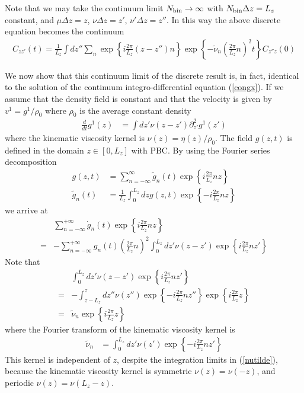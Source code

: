 \documentclass[b5paper,openright,11pt]{book}
\begin{document}
\begin{appendices}
Note that we may take the continuum limit ${N_{\rm bin}}\to\infty$ with ${N_{\rm bin}}\Delta z=L_z$ constant, and $\mu\Delta z=z$, $\nu \Delta z =z'$, $ \nu' \Delta z =z''$. In this way
the above discrete equation becomes the continuum
\begin{align}
  C_{zz'}(t)=\frac{1}{L_z}\int dz''\sum_{n}\exp\left\{i\frac{2\pi}{L_z}(z-z'')n\right\}
\exp\left\{-\tilde{\nu}_n\left(\frac{2\pi}{L_z}n\right)^2t\right\}C_{z''z}(0)
\end{align}

We now  show that this continuum  limit of the discrete  result is, in
fact, identical to the  solution of the continuum integro-differential
equation  (\ref{congx}).   If we  assume  that  the density  field  is
constant  and that  the velocity  is given  by $v^1=g^1/\rho_0$  where
$\rho_0$ is the average constant density
\begin{align}
  \frac{d}{dt} g^1(z)&=\int dz'{\nu}(z-z')\partial^2_{z'} g^1(z')
\label{pgz}
\end{align}
where the kinematic viscosity  kernel is $\nu(z)=\eta(z)/\rho_0$.  The
field $g(z,t)$  is defined  in the domain  $z\in[0,L_z]$ with  PBC. By
using the Fourier series decomposition
\begin{align}
  g(z,t)&=\sum_{n=-\infty}^{\infty} \tilde{g}_n(t) \exp\left\{i\frac{2\pi}{L_z}nz\right\}
\nonumber\\
\tilde{g}_n(t)&=\frac{1}{L_z}\int_0^{L_z}dzg(z,t)  \exp\left\{-i\frac{2\pi}{L_z}nz\right\}
\end{align}
 we arrive at
\begin{align}
&  \sum_{n=-\infty}^{+\infty}\dot{g}_n(t)\exp\left\{i\frac{2\pi}{L_z}nz\right\}
\nonumber\\=&-  \sum_{n=-\infty}^{+\infty}{g}_n(t)\left(\frac{2\pi}{L_z}n\right)^2
\int_0^{L_z}dz'\nu(z-z')\exp\left\{i\frac{2\pi}{L_z}nz'\right\}
\label{Fou1}
\end{align}
Note that
\begin{align}
&  \int_0^{L_z}dz'\nu(z-z')\exp\left\{i\frac{2\pi}{L_z}nz'\right\}
\nonumber\\
=&
-\int_{z-L_z}^z dz''\nu(z'')\exp\left\{-i\frac{2\pi}{L_z}nz''\right\} \exp\left\{i\frac{2\pi}{L_z}z\right\}
\nonumber\\
=&\tilde{\nu}_n\exp\left\{i\frac{2\pi}{L_z}z\right\}
\label{nutilde}
\end{align}
where the Fourier transform of the kinematic viscosity kernel is
\begin{align}
  \tilde{\nu}_n&=\int_{0}^{L_z} dz'\nu(z')\exp\left\{-i\frac{2\pi}{L_z}nz'\right\} 
\end{align}
This kernel is   independent   of  $z$,   despite   the   integration  limits   in
(\ref{nutilde}), because  the kinematic viscosity kernel  is symmetric
$\nu(z)=\nu(-z)$, and periodic $\nu(z)=\nu(L_z-z)$.


\end{appendices}
\end{document}
